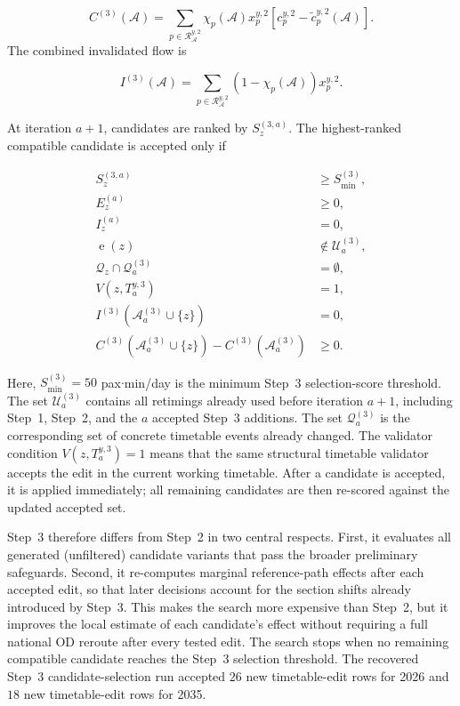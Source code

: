 \documentclass[preprint,12pt]{elsarticle}
\begin{document}
\begin{equation}
C^{(3)}(\mathcal{A})
=
\sum_{p\in\mathcal{R}^{y,2}_{\mathcal{A}}}
\chi_p(\mathcal{A})
x_p^{y,2}
\left[
c_p^{y,2}
-
\widetilde c_p^{y,2}(\mathcal{A})
\right].
\label{eq:part2-step3-combined-saving}
\end{equation}
\newpage
The combined invalidated flow is

\begin{equation}
I^{(3)}(\mathcal{A})
=
\sum_{p\in\mathcal{R}^{y,2}_{\mathcal{A}}}
\left(1-\chi_p(\mathcal{A})\right)
x_p^{y,2}.
\label{eq:part2-step3-combined-invalidated-flow}
\end{equation}

At iteration \(a+1\), candidates are ranked by \(S_z^{(3,a)}\). The highest-ranked compatible candidate is accepted only if

\begin{equation}
\begin{aligned}
S_z^{(3,a)} &\ge S^{(3)}_{\min},\\
E_z^{(a)} &\ge 0,\\
I_z^{(a)} &= 0,\\
\operatorname{e}(z) &\notin \mathcal{U}^{(3)}_a,\\
\mathcal{Q}_z\cap\mathcal{Q}^{(3)}_a &= \emptyset,\\
V(z,T^{y,3}_a) &= 1,\\
I^{(3)}(\mathcal{A}^{(3)}_a\cup\{z\}) &= 0,\\
C^{(3)}(\mathcal{A}^{(3)}_a\cup\{z\})
-
C^{(3)}(\mathcal{A}^{(3)}_a)
&\ge 0.
\end{aligned}
\label{eq:part2-step3-acceptance-rule}
\end{equation}

Here, \(S^{(3)}_{\min}=50\) pax\(\cdot\)min/day is the minimum Step~3 selection-score threshold. The set \(\mathcal{U}^{(3)}_a\) contains all retimings already used before iteration \(a+1\), including Step~1, Step~2, and the \(a\) accepted Step~3 additions. The set \(\mathcal{Q}^{(3)}_a\) is the corresponding set of concrete timetable events already changed. The validator condition \(V(z,T^{y,3}_a)=1\) means that the same structural timetable validator accepts the edit in the current working timetable. After a candidate is accepted, it is applied immediately; all remaining candidates are then re-scored against the updated accepted set.

Step~3 therefore differs from Step~2 in two central respects. First, it evaluates all generated (unfiltered) candidate variants that pass the broader preliminary safeguards. Second, it re-computes marginal reference-path effects after each accepted edit, so that later decisions account for the section shifts already introduced by Step~3. This makes the search more expensive than Step~2, but it improves the local estimate of each candidate's effect without requiring a full national OD reroute after every tested edit. The search stops when no remaining compatible candidate reaches the Step~3 selection threshold. The recovered Step~3 candidate-selection run accepted \(26\) new timetable-edit rows for 2026 and \(18\) new timetable-edit rows for 2035.
\end{document}
